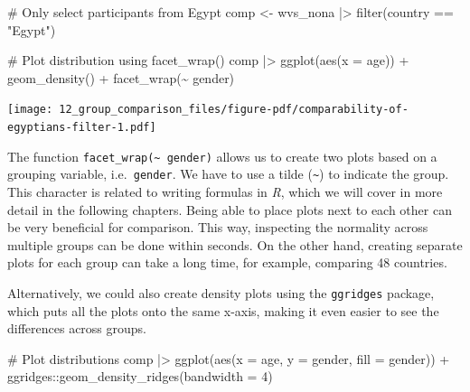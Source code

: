 \documentclass[
  letterpaper,
]{krantz}
\makeatletter
\newenvironment{Shaded}{\begin{snugshade}}{\end{snugshade}}
\newcommand{\AttributeTok}[1]{\textcolor[rgb]{0.40,0.45,0.13}{#1}}
\newcommand{\CommentTok}[1]{\textcolor[rgb]{0.37,0.37,0.37}{#1}}
\newcommand{\DecValTok}[1]{\textcolor[rgb]{0.68,0.00,0.00}{#1}}
\newcommand{\FunctionTok}[1]{\textcolor[rgb]{0.28,0.35,0.67}{#1}}
\newcommand{\NormalTok}[1]{\textcolor[rgb]{0.00,0.23,0.31}{#1}}
\newcommand{\OtherTok}[1]{\textcolor[rgb]{0.00,0.23,0.31}{#1}}
\newcommand{\SpecialCharTok}[1]{\textcolor[rgb]{0.37,0.37,0.37}{#1}}
\newcommand{\StringTok}[1]{\textcolor[rgb]{0.13,0.47,0.30}{#1}}
\newenvironment{kframe}{%
\medskip{}
\setlength{\fboxsep}{.8em}
 \def\at@end@of@kframe{}%
 \ifinner\ifhmode%
  \def\at@end@of@kframe{\end{minipage}}%
  \begin{minipage}{\columnwidth}%
 \fi\fi%
 \def\FrameCommand##1{\hskip\@totalleftmargin \hskip-\fboxsep
 \colorbox{shadecolor}{##1}\hskip-\fboxsep
     \hskip-\linewidth \hskip-\@totalleftmargin \hskip\columnwidth}%
 \MakeFramed {\advance\hsize-\width
   \@totalleftmargin\z@ \linewidth\hsize
   \@setminipage}}%
 {\par\unskip\endMakeFramed%
 \at@end@of@kframe}
\renewenvironment{Shaded}{\begin{kframe}}{\end{kframe}}
\makeatother
\begin{document}
\begin{Shaded}
\begin{Highlighting}[]
\CommentTok{\# Only select participants from \textquotesingle{}Egypt\textquotesingle{}}
\NormalTok{comp }\OtherTok{\textless{}{-}}
\NormalTok{  wvs\_nona }\SpecialCharTok{|\textgreater{}}
  \FunctionTok{filter}\NormalTok{(country }\SpecialCharTok{==} \StringTok{"Egypt"}\NormalTok{)}

\CommentTok{\# Plot distribution using facet\_wrap()}
\NormalTok{comp }\SpecialCharTok{|\textgreater{}}
  \FunctionTok{ggplot}\NormalTok{(}\FunctionTok{aes}\NormalTok{(}\AttributeTok{x =}\NormalTok{ age)) }\SpecialCharTok{+}
  \FunctionTok{geom\_density}\NormalTok{() }\SpecialCharTok{+}
  \FunctionTok{facet\_wrap}\NormalTok{(}\SpecialCharTok{\textasciitilde{}}\NormalTok{ gender)}
\end{Highlighting}
\end{Shaded}

\texttt{[image: 12\_group\_comparison\_files/figure-pdf/comparability-of-egyptians-filter-1.pdf]}

The function \texttt{facet\_wrap(\textasciitilde{}\ gender)} allows us
to create two plots based on a grouping variable, i.e.~\texttt{gender}.
We have to use a tilde (\texttt{\textasciitilde{}}) to indicate the
group. This character is related to writing formulas in \emph{R}, which
we will cover in more detail in the following chapters. Being able to
place plots next to each other can be very beneficial for comparison.
This way, inspecting the normality across multiple groups can be done
within seconds. On the other hand, creating separate plots for each
group can take a long time, for example, comparing 48 countries.

Alternatively, we could also create density plots using the
\texttt{ggridges} package, which puts all the plots onto the same
x-axis, making it even easier to see the differences across groups.

\begin{Shaded}
\begin{Highlighting}[]
\CommentTok{\# Plot distributions}
\NormalTok{comp }\SpecialCharTok{|\textgreater{}}
  \FunctionTok{ggplot}\NormalTok{(}\FunctionTok{aes}\NormalTok{(}\AttributeTok{x =}\NormalTok{ age,}
             \AttributeTok{y =}\NormalTok{ gender,}
             \AttributeTok{fill =}\NormalTok{ gender)) }\SpecialCharTok{+}
\NormalTok{  ggridges}\SpecialCharTok{::}\FunctionTok{geom\_density\_ridges}\NormalTok{(}\AttributeTok{bandwidth =} \DecValTok{4}\NormalTok{)}
\end{Highlighting}
\end{Shaded}
\end{document}
